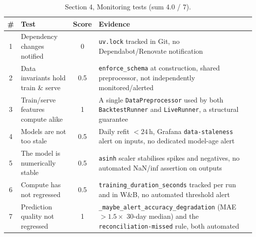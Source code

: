 \begin{table}[h]
  \centering
  \footnotesize
  \caption{Section 4, Monitoring tests (sum 4.0 / 7).}
  \renewcommand{\arraystretch}{1.3}
  \begin{tabularx}{\linewidth}{@{}c >{\raggedright\arraybackslash}p{3.9cm} c >{\raggedright\arraybackslash}X@{}}
    \toprule
    \textbf{\#} & \textbf{Test} & \textbf{Score} & \textbf{Evidence} \\
    \midrule
    1 & Dependency changes notified & 0 & \texttt{uv.lock} tracked in Git, no Dependabot/Renovate notification \\
    2 & Data invariants hold train \& serve & 0.5 & \texttt{enforce\_schema} at construction, shared preprocessor, not independently monitored/alerted \\
    3 & Train/serve features compute alike & 1 & A single \texttt{DataPreprocessor} used by both \texttt{BacktestRunner} and \texttt{LiveRunner}, a structural guarantee \\
    4 & Models are not too stale & 0.5 & Daily refit $<24$\,h, Grafana \texttt{data-staleness} alert on inputs, no dedicated model-age alert \\
    5 & The model is numerically stable & 0.5 & \texttt{asinh} scaler stabilises spikes and negatives, no automated NaN/inf assertion on outputs \\
    6 & Compute has not regressed & 0.5 & \texttt{training\_duration\_seconds} tracked per run and in W\&B, no automated threshold alert \\
    7 & Prediction quality not regressed & 1 & \texttt{\_maybe\_alert\_accuracy\_degradation} (MAE $>1.5\times$ 30-day median) and the \texttt{reconciliation-missed} rule, both automated \\
    \bottomrule
  \end{tabularx}
\end{table}

